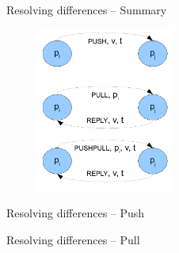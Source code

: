 \begin{frame}{Resolving differences -- Summary}
	
\begin{figure}
	\includegraphics[width=0.4\textwidth]{push-pull}
\end{figure}
	
\end{frame}

\begin{frame}{Resolving differences -- Push}

\begin{Procedure}
\caption{Anti-entropy, Push protocol executed by process $p_i$:}
\BlankLine
{}

\end{Procedure}


\end{frame}

\begin{frame}{Resolving differences -- Pull}

\begin{Procedure}
\caption{Anti-entropy, Pull protocol executed by process $p_i$:}
\BlankLine
{}
\end{Procedure}

\end{frame}



